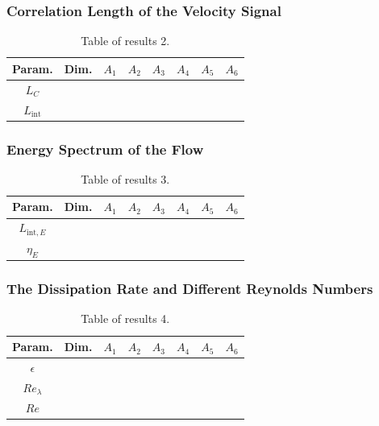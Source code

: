 \documentclass[11pt,titlepage]{article}
\begin{document}
\subsubsection{Correlation Length of the Velocity Signal}
\begin{table}[h]
\centering
\caption{Table of results 2.}
    \begin{tabular}{ | c | c | c | c | c | c | c | c |}
    \hline
    Param. & Dim. & $A_1$ & $A_2$ & $A_3$ & $A_4$ & $A_5$ & $A_6$ \\
    \hline
    $L_C$ & & & & & & & \\
    \hline
    $L_\mathrm{int}$ & & & & & & & \\
    \hline
    \end{tabular}
\end{table}

\subsubsection{Energy Spectrum of the Flow}
\begin{table}[h]
\centering
\caption{Table of results 3.}
    \begin{tabular}{ | c | c | c | c | c | c | c | c |}
    \hline
    Param. & Dim. & $A_1$ & $A_2$ & $A_3$ & $A_4$ & $A_5$ & $A_6$ \\
    \hline
    $L_{\mathrm{int},E}$ & & & & & & & \\
    \hline
    $\eta_E$ & & & & & & & \\
    \hline
    \end{tabular}
\end{table}

\subsubsection{The Dissipation Rate and Different Reynolds Numbers}
\begin{table}[h!]
\centering
\caption{Table of results 4.}
    \begin{tabular}{ | c | c | c | c | c | c | c | c |}
        \hline
        Param. & Dim. & $A_1$ & $A_2$ & $A_3$ & $A_4$ & $A_5$ & $A_6$ \\
        \hline
        $\epsilon$ & & & & & & & \\
        \hline
        $Re_\lambda$ & & & & & & & \\
        \hline
        $Re$ & & & & & & & \\
        \hline
    \end{tabular}
\end{table}
\end{document}

